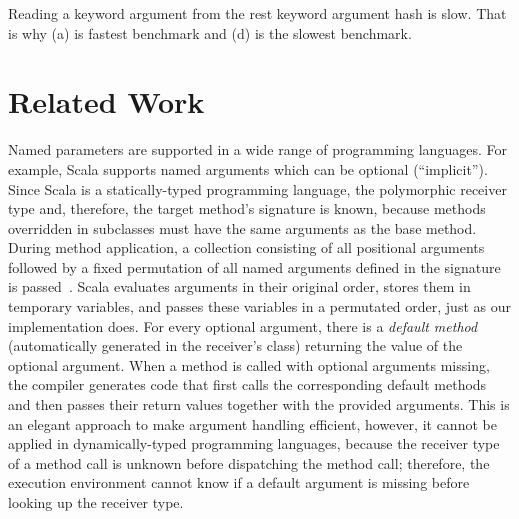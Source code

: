 \documentclass{sigplanconf} %
\begin{document}
Reading a keyword argument from the rest keyword argument hash is slow. That is why (a) is fastest benchmark and (d) is the slowest benchmark.

\section{Related Work}
\label{sec:related}
Named parameters are supported in a wide range of programming languages. For example, Scala supports named arguments which can be optional (``implicit''). Since Scala is a statically-typed programming language, the polymorphic receiver type and, therefore, the target method's signature is known, because methods overridden in subclasses must have the same arguments as the base method. During method application, a collection consisting of all positional arguments followed by a fixed permutation of all named arguments defined in the signature is passed~\cite{Rytz:2010:NDA:1774088.1774529}. Scala evaluates arguments in their original order, stores them in temporary variables, and passes these variables in a permutated order, just as our implementation does. For every optional argument, there is a \emph{default method} (automatically generated in the receiver's class) returning the value of the optional argument. When a method is called with optional arguments missing, the compiler generates code that first calls the corresponding default methods and then passes their return values together with the provided arguments. This is an elegant approach to make argument handling efficient, however, it cannot be applied in dynamically-typed programming languages, because the receiver type of a method call is unknown before dispatching the method call; therefore, the execution environment cannot know if a default argument is missing before looking up the receiver type.
\end{document}
